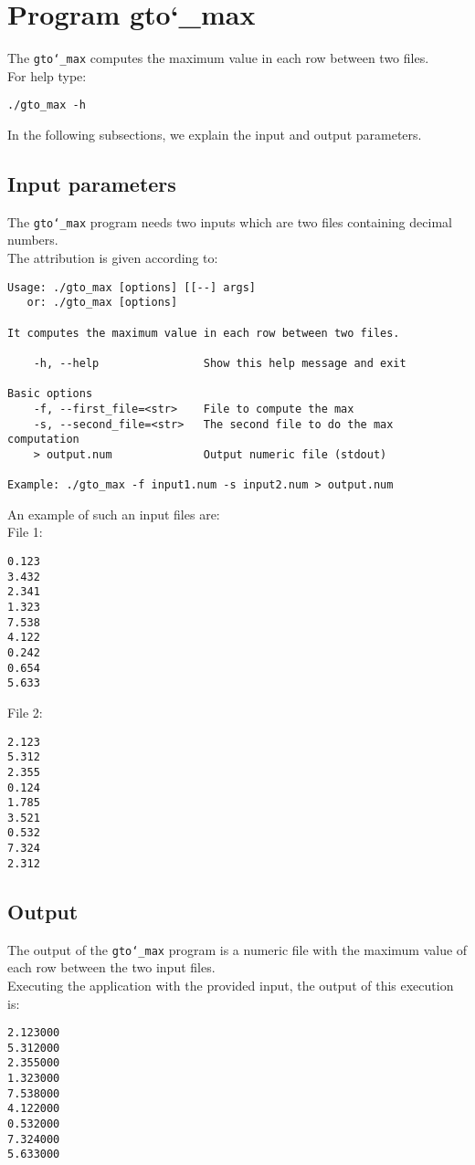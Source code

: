 \section{Program gto\char`_max}
The \texttt{gto\char`_max} computes the maximum value in each row between two files.\\
For help type:
\begin{lstlisting}
./gto_max -h
\end{lstlisting}
In the following subsections, we explain the input and output parameters.

\subsection*{Input parameters}

The \texttt{gto\char`_max} program needs two inputs which are two files containing decimal numbers.\\
The attribution is given according to:
\begin{lstlisting}
Usage: ./gto_max [options] [[--] args]
   or: ./gto_max [options]

It computes the maximum value in each row between two files.

    -h, --help                Show this help message and exit

Basic options
    -f, --first_file=<str>    File to compute the max
    -s, --second_file=<str>   The second file to do the max computation
    > output.num              Output numeric file (stdout)

Example: ./gto_max -f input1.num -s input2.num > output.num
\end{lstlisting}
An example of such an input files are:\\
File 1:
\begin{lstlisting}
0.123
3.432
2.341
1.323
7.538
4.122
0.242
0.654
5.633
\end{lstlisting}
File 2:
\begin{lstlisting}
2.123
5.312
2.355
0.124
1.785
3.521
0.532
7.324
2.312
\end{lstlisting}

\subsection*{Output}
The output of the \texttt{gto\char`_max} program is a numeric file with the maximum value of each row between the two input files.\\
Executing the application with the provided input, the output of this execution is:
\begin{lstlisting}
2.123000
5.312000
2.355000
1.323000
7.538000
4.122000
0.532000
7.324000
5.633000
\end{lstlisting}